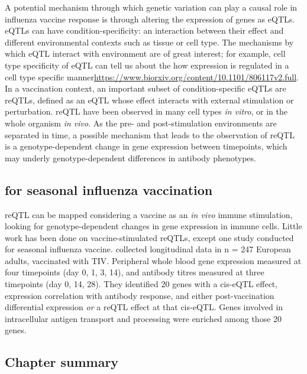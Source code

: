 A potential mechanism through which genetic variation can play a causal role in influenza vaccine response is through altering the expression of genes as \glspl{eQTL}.
eQTLs can have condition-specificity: an interaction between their effect and different environmental contexts such as tissue or cell type\autocite{albert2015RoleRegulatoryVariation,vandiedonck2017GeneticAssociationMolecular}.
The mechanisms by which eQTL interact with environment are of great interest;
for example, cell type specificity of eQTL can tell us about the how expression is regulated in a cell type specific manner\url{https://www.biorxiv.org/content/10.1101/806117v2.full}.
In a vaccination context, an important subset of condition-specific eQTLs are \glspl{reQTL}, defined as an eQTL whose effect interacts with external stimulation or perturbation.
reQTL have been observed in many cell types \textit{in vitro}, or in the whole organism \textit{in vivo}.
As the pre- and post-stimulation environments are separated in time, a possible mechanism that leads to the observation of reQTL is a genotype-dependent change in gene expression between timepoints,
which may underly genotype-dependent differences in antibody phenotypes.

\subsection{ for seasonal influenza vaccination}

\gls{reQTL} can be mapped considering a vaccine as an \textit{in vivo} immune stimulation, looking for genotype-dependent changes in gene expression in immune cells.
Little work has been done on vaccine-stimulated reQTLs, except one study conducted for seasonal influenza vaccine.
\autocite{franco2013IntegrativeGenomicAnalysis} collected longitudinal data in n = 247 European adults, vaccinated with \gls{TIV}.
Peripheral whole blood gene expression measured at four timepoints (day 0, 1, 3, 14), and antibody titres measured at three timepoints (day 0, 14, 28).
They identified 20 genes with a cis-eQTL effect, expression correlation with antibody response, and either post-vaccination differential expression \emph{or} a reQTL effect at that cis-eQTL.
Genes involved in intracellular antigen transport and processing were enriched among those 20 genes.

\subsection{Chapter summary}

